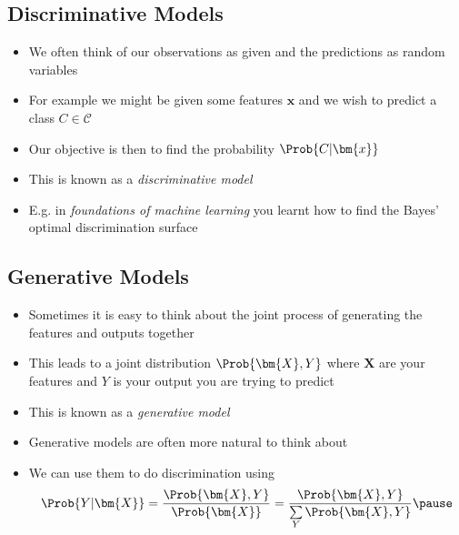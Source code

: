 
\begin{slide}
\section{Discriminative Models}

\begin{PauseHighLight}
  \begin{itemize}
  \item We often think of our observations as given and the predictions
    as random variables\pause
  \item For example we might be given some features $\bm{x}$ and we wish
    to predict a class $C\in\mathcal{C}$\pause
  \item Our objective is then to find the probability $\Prob{C|\bm{x}}$\pause
  \item This is known as a \emph{discriminative model}\pause
  \item E.g.{} in \textit{foundations of machine learning} you learnt how to
    find the Bayes' optimal discrimination surface\pause
  \end{itemize}
\end{PauseHighLight}

\end{slide}



\begin{slide}
\section{Generative Models}

\begin{PauseHighLight}
  \begin{itemize}
  \item Sometimes it is easy to think about the joint process of
    generating the features and outputs together\pause
  \item This leads to a joint distribution $\Prob{\bm{X},Y}$ where
    $\bm{X}$ are your features and $Y$ is your output you are trying to
    predict\pause
  \item This is known as a \emph{generative model}\pause
  \item Generative models are often more natural to think about\pause
  \item We can use them to do discrimination using
    \begin{align*}
      \Prob{Y|\bm{X}} = \frac{\Prob{\bm{X},Y}}{\Prob{\bm{X}}}
      = \frac{\Prob{\bm{X},Y}}{\sum\limits_Y \Prob{\bm{X}, Y}}\pause
    \end{align*}
  \end{itemize}
\end{PauseHighLight}

\end{slide}

